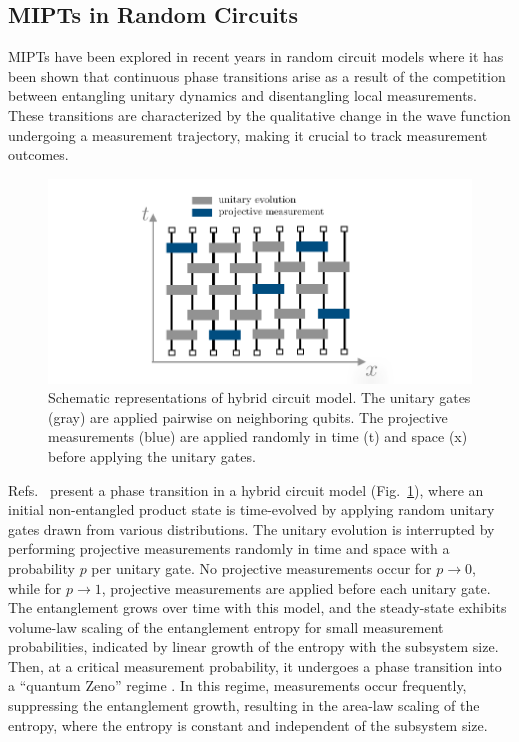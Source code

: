 \subsection{MIPTs in Random Circuits}

 MIPTs have been explored in recent years in random circuit models \cite{li2018,li2019,skinner2019,bao2020,jian2020,zabalo2020,zhang2020,lang2020, moghaddam2023,martin-vazquez2023} where it has been shown that continuous phase transitions arise as a result of the competition between entangling unitary dynamics and disentangling local measurements. These transitions are characterized by the qualitative change in the wave function undergoing a measurement trajectory, making it crucial to track measurement outcomes.

\begin{figure}[ht]
    \centering
    \includegraphics[width=\textwidth]{Chapters/Plots/Chapter1/Chapter0_Fig5.pdf}
    \caption{Schematic representations of hybrid circuit model. The unitary gates (gray) are applied pairwise on neighboring qubits. The projective measurements (blue) are applied randomly in time (t) and space (x) before applying the unitary gates.}
    \label{fig:Chapter0_Fig5}
\end{figure}

Refs.~\cite{li2018,li2019,skinner2019} present a phase transition in a hybrid circuit model (Fig.~\ref{fig:Chapter0_Fig5}), where an initial non-entangled product state is time-evolved by applying random unitary gates drawn from various distributions. The unitary evolution is interrupted by performing projective measurements randomly in time and space with a probability $p$ per unitary gate. No projective measurements occur for $p \to 0$, while for $p \to 1$, projective measurements are applied before each unitary gate. The entanglement grows over time with this model, and the steady-state exhibits volume-law scaling of the entanglement entropy for small measurement probabilities, indicated by linear growth of the entropy with the subsystem size. Then, at a critical measurement probability, it undergoes a phase transition into a ``quantum Zeno'' regime \cite{itano1990}. In this regime, measurements occur frequently, suppressing the entanglement growth, resulting in the area-law scaling of the entropy, where the entropy is constant and independent of the subsystem size.

